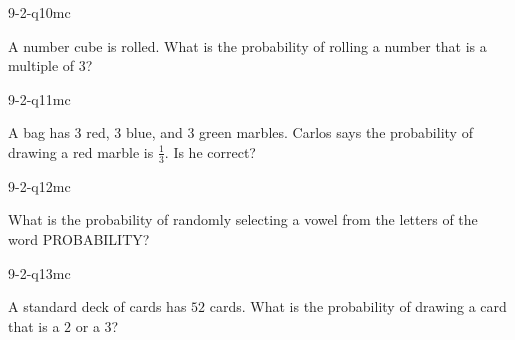 \begin{practiceQuestion}{9-2-q10}{mc}
\begin{questionText}
A number cube is rolled. What is the probability of rolling a number that is a multiple of $3$?
\end{questionText}
\end{practiceQuestion}

\begin{practiceQuestion}{9-2-q11}{mc}
\begin{questionText}
A bag has $3$ red, $3$ blue, and $3$ green marbles. Carlos says the probability of drawing a red marble is $\frac{1}{3}$. Is he correct?
\end{questionText}
\end{practiceQuestion}

\begin{practiceQuestion}{9-2-q12}{mc}
\begin{questionText}
What is the probability of randomly selecting a vowel from the letters of the word PROBABILITY?
\end{questionText}
\end{practiceQuestion}

\begin{practiceQuestion}{9-2-q13}{mc}
\begin{questionText}
A standard deck of cards has $52$ cards. What is the probability of drawing a card that is a $2$ or a $3$?
\end{questionText}
\end{practiceQuestion}

